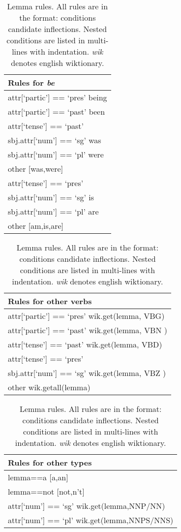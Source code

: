 \documentclass[11pt]{article}
\begin{document}
\begin{table}[t]
\centering
\footnotesize
\begin{tabularx}{.45\textwidth}{|X|}
\hline 
\textbf{Rules for {\it be}} \\ 
\hline 
attr[`partic'] == `pres'  being\\ 
attr[`partic'] == `past'  been\\ 
attr[`tense'] == `past'\\ 
sbj.attr[`num'] == `sg'  was\\ 
sbj.attr[`num'] == `pl'  were\\ 
other  [was,were]\\ 
attr[`tense'] == `pres'\\ 
sbj.attr[`num'] == `sg'  is\\ 
sbj.attr[`num'] == `pl'  are\\ 
other  [am,is,are]  \\ 
\hline 
\end{tabularx} 

\begin{tabularx}{.45\textwidth}{|X|}
\hline 
\textbf{Rules for other verbs} \\ 
\hline 
attr[`partic'] == `pres'  wik.get(lemma, VBG) \\
attr[`partic'] == `past'  wik.get(lemma, VBN ) \\
attr[`tense'] == `past'  wik.get(lemma, VBD) \\
attr[`tense'] == `pres' \\
sbj.attr[`num'] == `sg'  wik.get(lemma, VBZ )\\
other  wik.getall(lemma) \\
\hline 
\end{tabularx} 

\begin{tabularx}{.45\textwidth}{|X|}
\hline 
\textbf{Rules for other types} \\ 
\hline 
lemma==a  [a,an] \\
lemma==not  [not,n't] \\
attr[`num'] == `sg'  wik.get(lemma,NNP/NN) \\ 
attr[`num'] == `pl'  wik.get(lemma,NNPS/NNS) \\ 
\hline 
\end{tabularx} 
\caption{Lemma rules. All rules are in the format: conditions  candidate inflections. Nested conditions are listed in multi-lines with indentation. {\it wik} denotes english wiktionary.}
\label{tbl-morphology-generation}
\end{table}
\end{document}
